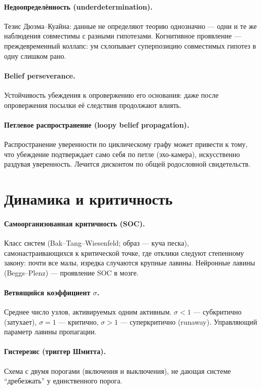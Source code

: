\paragraph{Недоопределённость (underdetermination).} Тезис Дюэма--Куайна:
данные не определяют теорию однозначно --- одни и те же наблюдения
совместимы с разными гипотезами. Когнитивное проявление --- преждевременный
коллапс: ум схлопывает суперпозицию совместимых гипотез в одну слишком рано.

\paragraph{Belief perseverance.} Устойчивость убеждения к опровержению его
основания: даже после опровержения посылки её следствия продолжают влиять.

\paragraph{Петлевое распространение (loopy belief propagation).}
Распространение уверенности по циклическому графу может привести к тому, что
убеждение подтверждает само себя по петле (эхо-камера), искусственно
раздувая уверенность. Лечится дисконтом по общей родословной свидетельств.

\section*{Динамика и критичность}

\paragraph{Самоорганизованная критичность (SOC).} Класс систем
(Bak--Tang--Wiesenfeld; образ --- куча песка), самонастраивающихся к
критической точке, где отклики следуют степенному закону: почти все малы,
изредка случаются крупные лавины. Нейронные лавины (Beggs--Plenz) ---
проявление SOC в мозге.

\paragraph{Ветвящийся коэффициент $\sigma$.} Среднее число узлов,
активируемых одним активным. $\sigma<1$ --- субкритично (затухает),
$\sigma=1$ --- критично, $\sigma>1$ --- суперкритично (runaway).
Управляющий параметр лавины пропагации.

\paragraph{Гистерезис (триггер Шмитта).} Схема с двумя порогами (включения и
выключения), не дающая системе ``дребезжать'' у единственного порога.

